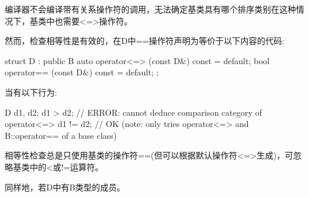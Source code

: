 编译器不会编译带有关系操作符的调用，无法确定基类具有哪个排序类别在这种情况下，基类中也需要<=>操作符。

然而，检查相等性是有效的，在D中==操作符声明为等价于以下内容的代码:

\begin{cpp}
struct D : public B {
	auto operator<=> (const D&) const = default;
	bool operator== (const D&) const = default;
};
\end{cpp}

当有以下行为:

\begin{cpp}
D d1, d2;
d1 > d2; // ERROR: cannot deduce comparison category of operator<=>
d1 != d2; // OK (note: only tries operator<=> and B::operator== of a base class)
\end{cpp}

相等性检查总是只使用基类的操作符==(但可以根据默认操作符<=>生成)，可忽略基类中的<或!=运算符。

同样地，若D中有B类型的成员。
